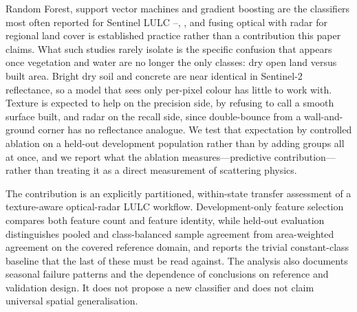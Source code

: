 \documentclass[conference]{IEEEtran}
\begin{document}
Random Forest, support vector machines and gradient boosting are the classifiers most often reported for Sentinel LULC \cite{r7}--\cite{r9}, \cite{r13}, and fusing optical with radar for regional land cover is established practice \cite{r33} rather than a contribution this paper claims. What such studies rarely isolate is the specific confusion that appears once vegetation and water are no longer the only classes: dry open land versus built area. Bright dry soil and concrete are near identical in Sentinel-2 reflectance, so a model that sees only per-pixel colour has little to work with. Texture is expected to help on the precision side, by refusing to call a smooth surface built, and radar on the recall side, since double-bounce from a wall-and-ground corner has no reflectance analogue. We test that expectation by controlled ablation on a held-out development population rather than by adding groups all at once, and we report what the ablation measures---predictive contribution---rather than treating it as a direct measurement of scattering physics.

The contribution is an explicitly partitioned, within-state transfer assessment of a texture-aware optical-radar LULC workflow. Development-only feature selection compares both feature count and feature identity, while held-out evaluation distinguishes pooled and class-balanced sample agreement from area-weighted agreement on the covered reference domain, and reports the trivial constant-class baseline that the last of these must be read against. The analysis also documents seasonal failure patterns and the dependence of conclusions on reference and validation design. It does not propose a new classifier and does not claim universal spatial generalisation.
\end{document}
